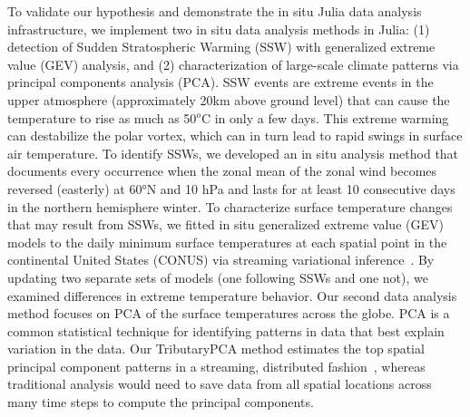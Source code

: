 \documentclass{juliacon}
\begin{document}
To validate our hypothesis and demonstrate the in situ Julia data analysis infrastructure, we implement two in situ data analysis methods in Julia: (1) detection of Sudden Stratospheric Warming (SSW) with generalized extreme value (GEV) analysis, and (2) characterization of large-scale climate patterns via principal components analysis (PCA). SSW events are extreme events in the upper atmosphere (approximately 20km above ground level) that can cause the temperature to rise as much as 50$^o$C in only a few days.  This extreme warming can destabilize the polar vortex, which can in turn lead to rapid swings in surface air temperature. To identify SSWs, we developed an in situ analysis method that documents every occurrence when the zonal mean of the zonal wind becomes reversed (easterly) at 60°N and 10 hPa and lasts for at least 10 consecutive days in the northern hemisphere winter. To characterize surface temperature changes that may result from SSWs, we fitted in situ generalized extreme value (GEV) models to the daily minimum surface temperatures at each spatial point in the continental United States (CONUS) via streaming variational inference~\cite{broderick2013streaming}. By updating two separate sets of models (one following SSWs and one not), we examined differences in extreme temperature behavior. Our second data analysis method focuses on PCA of the surface temperatures across the globe. PCA is a common statistical technique for identifying patterns in data that best explain variation in the data. Our TributaryPCA method estimates the top spatial principal component patterns in a streaming, distributed fashion~\cite{wang2021tributarypca}, whereas traditional analysis would need to save data from all spatial locations across many time steps to compute the principal components.
\end{document}
